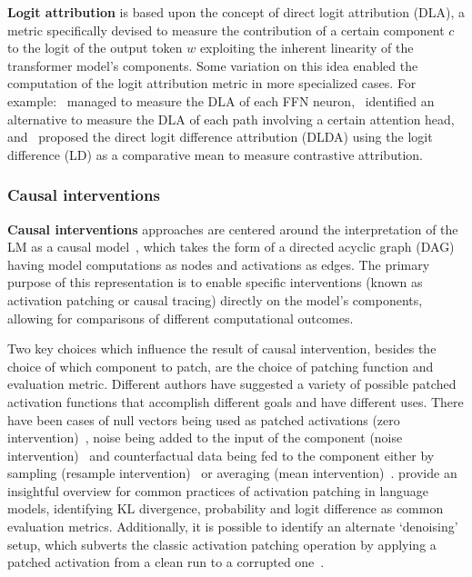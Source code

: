 \textbf{Logit attribution} is based upon the concept of direct logit attribution (DLA), a metric specifically devised to measure the contribution of a certain component $c$ to the logit of the output token $w$ exploiting the inherent linearity of the transformer model's components.
Some variation on this idea enabled the computation of the logit attribution metric in more specialized cases.
For example:~\citet{geva2022} managed to measure the DLA of each FFN neuron,~\citet{ferrando2023} identified an alternative to measure the DLA of each path involving a certain attention head, and~\citet{wang2023} proposed the direct logit difference attribution (DLDA) using the logit difference (LD) as a comparative mean to measure contrastive attribution.

\subsubsection*{Causal interventions}

\textbf{Causal interventions} approaches are centered around the interpretation of the LM as a causal model~\cite{geiger2021,mcgrath2023}, which takes the form of a directed acyclic graph (DAG) having model computations as nodes and activations as edges.
The primary purpose of this representation is to enable specific interventions (known as activation patching or causal tracing) directly on the model's components, allowing for comparisons of different computational outcomes.

Two key choices which influence the result of causal intervention, besides the choice of which component to patch, are the choice of patching function and evaluation metric.
Different authors have suggested a variety of possible patched activation functions that accomplish different goals and have different uses.
There have been cases of null vectors being used as patched activations (zero intervention)~\cite{olsson2022, mohebbi2023}, noise being added to the input of the component (noise intervention)~\cite{meng2022} and counterfactual data being fed to the component either by sampling (resample intervention)~\cite{hanna2023, conmy2023} or averaging (mean intervention)~\cite{wang2023}.
\citet{zhang2024} provide an insightful overview for common practices of activation patching in language models, identifying KL divergence, probability and logit difference as common evaluation metrics.
Additionally, it is possible to identify an alternate `denoising' setup, which subverts the classic activation patching operation by applying a patched activation from a clean run to a corrupted one~\cite{lieberum2023, meng2022}.

